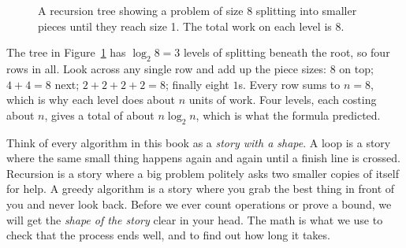 \begin{figure}[htbp]
\centering
{}
\caption{A recursion tree showing a problem of size 8 splitting into smaller pieces until they reach size 1. The total work on each level is 8.}
\label{fig:ch00-recursion-tree}
\end{figure}

The tree in Figure~\ref{fig:ch00-recursion-tree} has $\log_2 8 = 3$ levels of splitting beneath the root, so four rows in
all. Look across any single row and add up the piece sizes: $8$ on top; $4 + 4 =
8$ next; $2+2+2+2 = 8$; finally eight $1$s. Every row sums to $n = 8$, which is
why each level does about $n$ units of work. Four levels, each costing about $n$,
gives a total of about $n \log_2 n$, which is what the formula predicted.

\begin{intuitionbox}
Think of every algorithm in this book as a \emph{story with a shape}. A loop is
a story where the same small thing happens again and again until a finish line
is crossed. Recursion is a story where a big problem politely asks two smaller
copies of itself for help. A greedy algorithm is a story where you grab the best
thing in front of you and never look back. Before we ever count operations or
prove a bound, we will get the \emph{shape of the story} clear in your head. The
math is what we use to check that the process ends well, and to find out
how long it takes.
\end{intuitionbox}

